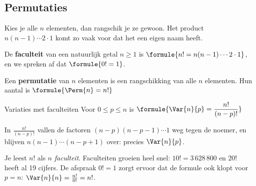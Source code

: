 \begin{oefeningen}
\end{oefeningen}

\subsection{Permutaties}

Kies je alle $n$ elementen, dan rangschik je ze gewoon. Het product $n(n - 1) \cdots 2 \cdot 1$ komt zo vaak voor dat het een eigen naam heeft.

\begin{theorie}
De \textbf{\textcolor{accent}{faculteit}} van een natuurlijk getal $n \geqslant 1$ is \quad $\formule{n! = n(n - 1) \cdots 2 \cdot 1}$, \quad en we spreken af dat $\formule{0! = 1}$.

\vspace{1mm}
Een \textbf{\textcolor{accent}{permutatie}} van $n$ elementen is een rangschikking van alle $n$ elementen. Hun aantal is \quad $\formule{\Perm{n} = n!}$

\begin{stelling}{Variaties met faculteiten}
Voor $0 \leqslant p \leqslant n$ is \quad $\formule{\Var{n}{p} = \dfrac{n!}{(n - p)!}}$
\end{stelling}

\begin{bewijs}
In $\frac{n!}{(n - p)!}$ vallen de factoren $(n - p)(n - p - 1) \cdots 1$ weg tegen de noemer, en blijven $n(n - 1) \cdots (n - p + 1)$ over: precies $\Var{n}{p}$.
\end{bewijs}
\end{theorie}

Je leest $n!$ als \textit{$n$ faculteit}. Faculteiten groeien heel snel: $10! = 3\,628\,800$ en $20!$ heeft al 19 cijfers. De afspraak $0! = 1$ zorgt ervoor dat de formule ook klopt voor $p = n$: $\Var{n}{n} = \frac{n!}{0!} = n!$.



